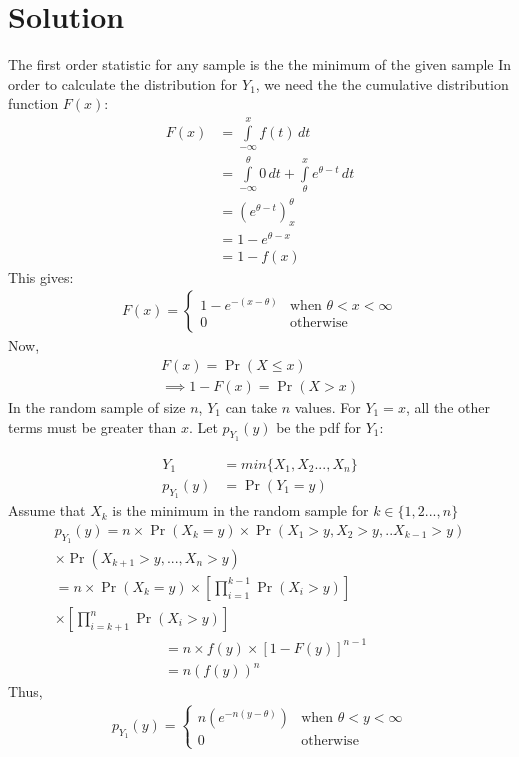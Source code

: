 \documentclass[journal,12pt,twocolumn]{IEEEtran}
\providecommand{\pr}[1]{\ensuremath{\Pr\left(#1\right)}}
\providecommand{\brak}[1]{\ensuremath{\left(#1\right)}}
\theoremstyle{remark}
\numberwithin{equation}{subsection}
\begin{document}
\section{\textbf{Solution}}
The first order statistic for any sample is the the minimum of the given sample 
In order to calculate the distribution for $Y_1$, we need the the cumulative distribution function $F(x)$:\\
\begin{align}
  F(x) &=\displaystyle\int\limits_{-\infty}^{x} f(t) \,dt\\
  &= \displaystyle\int\limits_{-\infty}^{\theta}0\,dt + \displaystyle\int\limits_{\theta}^{x}e^{\theta-t}\,dt\\
  &=\brak{e^{\theta-t}}_{x}^{\theta}\\
  &= 1-e^{\theta-x} \\
  &= 1-f(x)
\end{align}
This gives: 
\begin{align}
    F(x) = 
    \begin{cases}
    1-e^{-(x-\theta)} &\text{when }\theta<x<\infty\\
    0 &\text{otherwise}
    \end{cases}
\end{align}
Now,
\begin{align}
    F(x) = \pr{X\leq x}\\
    \implies 1-F(x) = \pr{X>x}
\end{align}
In the random sample of size $n$, $Y_1$ can take $n$  values. For $Y_1 = x$, all the other terms must be greater than $x$. Let $p_{Y_1}(y)$ be the pdf for $Y_1$:

\begin{align}
    Y_1 &= \textit{min}\{X_1, X_2...,X_n\}\\
    p_{Y_1}(y) &= \pr{Y_1=y}
\end{align}
Assume that $X_k$ is the minimum in the random sample for $k \in \{1,2...,n\}$
\begin{multline}
    p_{Y_1}(y) = n\times\pr{X_k=y} \times\pr{X_1>y, X_2>y,..X_{k-1}>y} \\
    \times\pr{X_{k+1}>y, ..., X_n>y}\\
    = n\times \pr{X_k=y}\times\left[\prod_{i=1}^{k-1}\pr{X_i>y}\right]\\
    \times\left[\prod_{i=k+1}^{n}\pr{X_i>y}\right]\nonumber
\end{multline}
\begin{align}
    &= n\times f(y)\times[1-F(y)]^{n-1}\nonumber\\
    &= n(f(y))^{n}
\end{align}
Thus,
\begin{align}
    p_{Y_1}(y) = \label{eq_1}
    \begin{cases}
    n(e^{-n(y-\theta)})&\text{when }\theta<y<\infty\\
    0 &\text{otherwise }
    \end{cases}
\end{align}
\end{document}
